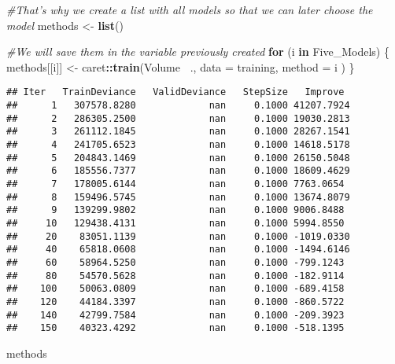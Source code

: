 \documentclass[]{article}
\newenvironment{Shaded}{\begin{snugshade}}{\end{snugshade}}
\newcommand{\CommentTok}[1]{\textcolor[rgb]{0.56,0.35,0.01}{\textit{#1}}}
\newcommand{\ControlFlowTok}[1]{\textcolor[rgb]{0.13,0.29,0.53}{\textbf{#1}}}
\newcommand{\DataTypeTok}[1]{\textcolor[rgb]{0.13,0.29,0.53}{#1}}
\newcommand{\KeywordTok}[1]{\textcolor[rgb]{0.13,0.29,0.53}{\textbf{#1}}}
\newcommand{\NormalTok}[1]{#1}
\newcommand{\OperatorTok}[1]{\textcolor[rgb]{0.81,0.36,0.00}{\textbf{#1}}}
\newcommand{\StringTok}[1]{\textcolor[rgb]{0.31,0.60,0.02}{#1}}
\begin{document}
\begin{Shaded}
\begin{Highlighting}[]
\CommentTok{#That's why we create a list with all models so that we can later choose the model}
\NormalTok{methods <-}\StringTok{ }\KeywordTok{list}\NormalTok{()}

\CommentTok{#We will save them in the variable previously created}
\ControlFlowTok{for}\NormalTok{ (i }\ControlFlowTok{in}\NormalTok{ Five_Models) \{}
\NormalTok{  methods[[i]] <-}\StringTok{ }\NormalTok{caret}\OperatorTok{::}\KeywordTok{train}\NormalTok{(Volume }\OperatorTok{~}\NormalTok{., }\DataTypeTok{data =}\NormalTok{ training, }\DataTypeTok{method =}\NormalTok{ i )}
\NormalTok{\}}
\end{Highlighting}
\end{Shaded}

\begin{verbatim}
## Iter   TrainDeviance   ValidDeviance   StepSize   Improve
##      1   307578.8280             nan     0.1000 41207.7924
##      2   286305.2500             nan     0.1000 19030.2813
##      3   261112.1845             nan     0.1000 28267.1541
##      4   241705.6523             nan     0.1000 14618.5178
##      5   204843.1469             nan     0.1000 26150.5048
##      6   185556.7377             nan     0.1000 18609.4629
##      7   178005.6144             nan     0.1000 7763.0654
##      8   159496.5745             nan     0.1000 13674.8079
##      9   139299.9802             nan     0.1000 9006.8488
##     10   129438.4131             nan     0.1000 5994.8550
##     20    83051.1139             nan     0.1000 -1019.0330
##     40    65818.0608             nan     0.1000 -1494.6146
##     60    58964.5250             nan     0.1000 -799.1243
##     80    54570.5628             nan     0.1000 -182.9114
##    100    50063.0809             nan     0.1000 -689.4158
##    120    44184.3397             nan     0.1000 -860.5722
##    140    42799.7584             nan     0.1000 -209.3923
##    150    40323.4292             nan     0.1000 -518.1395
\end{verbatim}

\begin{Shaded}
\begin{Highlighting}[]
\NormalTok{methods}
\end{Highlighting}
\end{Shaded}
\end{document}

